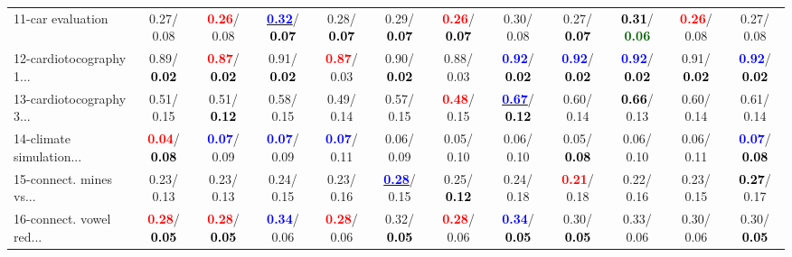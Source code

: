 \begin{table}[h]
\begin{center}
{\begin{tabular}{lc|c|c|c|c|c|c|c|c|c|c}
11-car evaluation &   0.27/  0.08 & \textcolor{red}{\textbf{  0.26}}/  0.08 & \underline{\textcolor{blue}{\textbf{  0.32}}}/\textcolor{black}{\textbf{  0.07}} &   0.28/\textcolor{black}{\textbf{  0.07}} &   0.29/\textcolor{black}{\textbf{  0.07}} & \textcolor{red}{\textbf{  0.26}}/\textcolor{black}{\textbf{  0.07}} &   0.30/  0.08 &   0.27/\textcolor{black}{\textbf{  0.07}} & \textcolor{black}{\textbf{  0.31}}/\textcolor{darkgreen}{\textbf{  0.06}} & \textcolor{red}{\textbf{  0.26}}/  0.08 &   0.27/  0.08 \\
12-cardiotocography 1... &   0.89/\textcolor{black}{\textbf{  0.02}} & \textcolor{red}{\textbf{  0.87}}/\textcolor{black}{\textbf{  0.02}} &   0.91/\textcolor{black}{\textbf{  0.02}} & \textcolor{red}{\textbf{  0.87}}/  0.03 &   0.90/\textcolor{black}{\textbf{  0.02}} &   0.88/  0.03 & \textcolor{blue}{\textbf{  0.92}}/\textcolor{black}{\textbf{  0.02}} & \textcolor{blue}{\textbf{  0.92}}/\textcolor{black}{\textbf{  0.02}} & \textcolor{blue}{\textbf{  0.92}}/\textcolor{black}{\textbf{  0.02}} &   0.91/\textcolor{black}{\textbf{  0.02}} & \textcolor{blue}{\textbf{  0.92}}/\textcolor{black}{\textbf{  0.02}} \\
13-cardiotocography 3... &   0.51/  0.15 &   0.51/\textcolor{black}{\textbf{  0.12}} &   0.58/  0.15 &   0.49/  0.14 &   0.57/  0.15 & \textcolor{red}{\textbf{  0.48}}/  0.15 & \underline{\textcolor{blue}{\textbf{  0.67}}}/\textcolor{black}{\textbf{  0.12}} &   0.60/  0.14 & \textcolor{black}{\textbf{  0.66}}/  0.13 &   0.60/  0.14 &   0.61/  0.14 \\
14-climate simulation... & \textcolor{red}{\textbf{  0.04}}/\textcolor{black}{\textbf{  0.08}} & \textcolor{blue}{\textbf{  0.07}}/  0.09 & \textcolor{blue}{\textbf{  0.07}}/  0.09 & \textcolor{blue}{\textbf{  0.07}}/  0.11 &   0.06/  0.09 &   0.05/  0.10 &   0.06/  0.10 &   0.05/\textcolor{black}{\textbf{  0.08}} &   0.06/  0.10 &   0.06/  0.11 & \textcolor{blue}{\textbf{  0.07}}/\textcolor{black}{\textbf{  0.08}} \\ \hline
15-connect. mines vs... &   0.23/  0.13 &   0.23/  0.13 &   0.24/  0.15 &   0.23/  0.16 & \underline{\textcolor{blue}{\textbf{  0.28}}}/  0.15 &   0.25/\textcolor{black}{\textbf{  0.12}} &   0.24/  0.18 & \textcolor{red}{\textbf{  0.21}}/  0.18 &   0.22/  0.16 &   0.23/  0.15 & \textcolor{black}{\textbf{  0.27}}/  0.17 \\
16-connect. vowel red... & \textcolor{red}{\textbf{  0.28}}/\textcolor{black}{\textbf{  0.05}} & \textcolor{red}{\textbf{  0.28}}/\textcolor{black}{\textbf{  0.05}} & \textcolor{blue}{\textbf{  0.34}}/  0.06 & \textcolor{red}{\textbf{  0.28}}/  0.06 &   0.32/\textcolor{black}{\textbf{  0.05}} & \textcolor{red}{\textbf{  0.28}}/  0.06 & \textcolor{blue}{\textbf{  0.34}}/\textcolor{black}{\textbf{  0.05}} &   0.30/\textcolor{black}{\textbf{  0.05}} &   0.33/  0.06 &   0.30/  0.06 &   0.30/\textcolor{black}{\textbf{  0.05}} \\

\end{tabular}}
\end{center}
\end{table}
